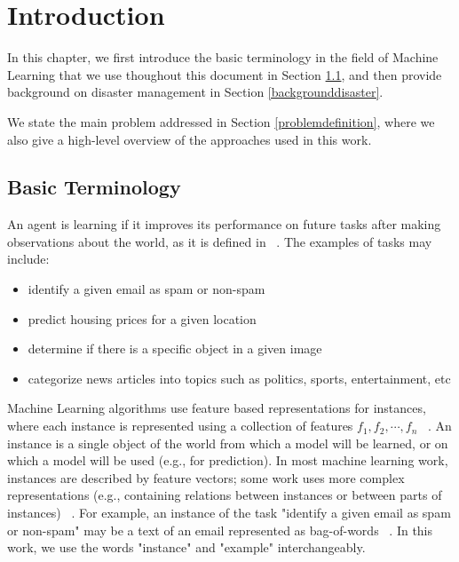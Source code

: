 \cleardoublepage

\chapter{Introduction}
\label{introduction}

In this chapter, we first introduce the basic terminology in the field of Machine Learning that we use thoughout this document in Section \ref{basicterminology}, and then provide background on disaster management in Section \ref{backgrounddisaster}.

We state the main problem addressed in Section \ref{problemdefinition}, where we also give a high-level overview of the approaches used in this work. 

\section{Basic Terminology}
\label{basicterminology}

An agent is learning if it improves its performance on future tasks after making observations
about the world, as it is defined in ~\citep{rn}. The examples of tasks may include: 
\begin{itemize}
  \item identify a given email as spam or non-spam
  \item predict housing prices for a given location
  \item determine if there is a specific object in a given image
  \item categorize news articles into topics such as politics, sports, entertainment, etc
\end{itemize}

Machine Learning algorithms use feature based representations for instances, where each instance is represented using a collection of features $f_1,f_2,\cdots,f_n$ ~\citep{tom}. An instance is a single object of the world from which a model will be learned, or on which a model will be used (e.g., for prediction). In most machine learning work, instances are described by feature vectors; some work uses more complex representations (e.g., containing relations between instances or between parts of instances) ~\citep{terms}. For example, an instance of the task "identify a given email as spam or non-spam" may be a text of an email represented as bag-of-words ~\citep{tom}. In this work, we use the words "instance" and "example" interchangeably. 

